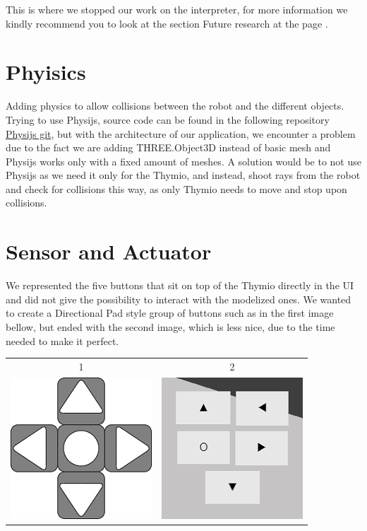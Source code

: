 \documentclass{scrbook}
\begin{document}
This is where we stopped our work on the interpreter, for more information we kindly recommend you to look at the section Future research at the page \pageref{future}. 

\section{Phyisics}

Adding physics to allow collisions between the robot and the different objects. Trying to use Physijs, source code can be found in the following repository \href{https://github.com/chandlerprall/Physijs/wiki/Basic-Setup}{Physijs git}, 
but with the architecture of our application, we encounter a problem due to the fact we are adding THREE.Object3D instead of basic mesh and Physijs works only with a fixed amount of meshes. A solution would be to not use Physijs as we need it only for the Thymio,
and instead, shoot rays from the robot and check for collisions this way, as only Thymio needs to move and stop upon collisions.

\section{Sensor and Actuator}

We represented the five buttons that sit on top of the Thymio directly in the UI and did not give the possibility to interact with the modelized ones. We wanted to create a Directional Pad style group of buttons such as in the first image bellow, 
but ended with the second image, which is less nice, due to the time needed to make it perfect.

\begin{center}
  \begin{tabular}{c c}
	  1  & 2 \\
    \includegraphics{dpad} & \includegraphics{fake_dpad}
  \end{tabular}
\end{center}
\end{document}
